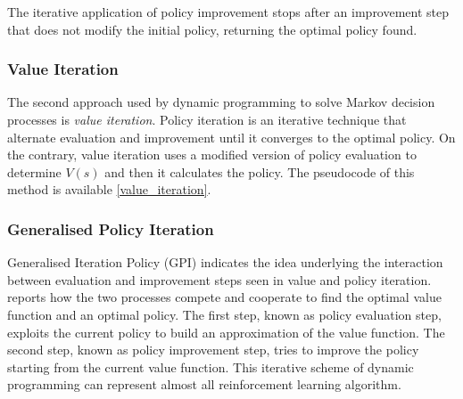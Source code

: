 
The iterative application of policy improvement stops after an improvement step that does not modify the initial policy, returning the optimal policy found.

\subsubsection{Value Iteration}

The second approach used by dynamic programming to solve Markov decision processes is \textit{value iteration}.
Policy iteration is an iterative technique that alternate evaluation and improvement until it converges to the optimal policy.
On the contrary, value iteration uses a modified version of policy evaluation to determine $V(s)$ and then it calculates the policy.
The pseudocode of this method is available \vref{value_iteration}.

\subsubsection{Generalised Policy Iteration}

Generalised Iteration Policy (GPI) indicates the idea underlying the interaction between evaluation and improvement steps seen in value and policy iteration.
 reports how the two processes compete and cooperate to find the optimal value function and an optimal policy. The first step, known as policy evaluation step, exploits the current policy to build an approximation of the value function. The second step, known as policy improvement step, tries to improve the policy starting from the current value function.
This iterative scheme of dynamic programming can represent almost all reinforcement learning algorithm.


